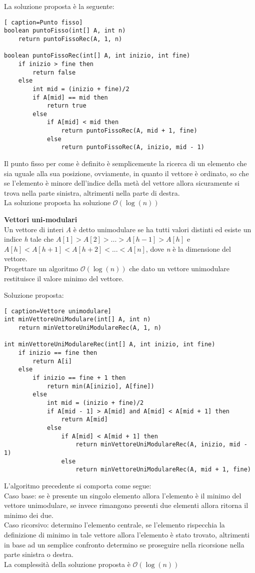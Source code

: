 \documentclass[../cheatSheetAlgoritmi.tex]{subfiles}
\begin{document}
\bigskip
La soluzione proposta è la seguente:
 

\begin{lstlisting}[ caption=Punto fisso]
boolean puntoFisso(int[] A, int n)
	return puntoFissoRec(A, 1, n)

boolean puntoFissoRec(int[] A, int inizio, int fine)
	if inizio > fine then
    	return false
  	else
    	int mid = (inizio + fine)/2
    	if A[mid] == mid then
      		return true
    	else
      		if A[mid] < mid then
        		return puntoFissoRec(A, mid + 1, fine)
      		else
        		return puntoFissoRec(A, inizio, mid - 1)
\end{lstlisting}
Il punto fisso per come è definito è semplicemente la ricerca di un elemento che sia uguale alla sua posizione, ovviamente, in quanto il vettore è ordinato, so che se l'elemento è minore dell'indice della metà del vettore allora sicuramente si trova nella parte sinistra, altrimenti nella parte di destra. \\
La soluzione proposta ha soluzione $\mathcal{O}(\log(n))$

\bigskip
\textbf{Vettori uni-modulari} \\
Un vettore di interi \textit{A} è detto unimodulare se ha tutti valori distinti ed esiste un indice \textit{h} tale che $ A[1] > A[2] > ... > A[h-1] > A[h] $ e $A[h] < A[h+1] < A[h+2] < ... < A[n]$, dove \textit{n} è la dimensione del vettore.\\ Progettare un algoritmo $\mathcal{O}(\log(n))$ che dato un vettore unimodulare restituisce il valore minimo del vettore.

\bigskip
Soluzione proposta:
\begin{lstlisting}[ caption=Vettore unimodulare]
int minVettoreUniModulare(int[] A, int n)
	return minVettoreUniModulareRec(A, 1, n)
	
int minVettoreUniModulareRec(int[] A, int inizio, int fine)
	if inizio == fine then
    	return A[i]
  	else
    	if inizio == fine + 1 then
      		return min(A[inizio], A[fine])
    	else
      		int mid = (inizio + fine)/2 
      		if A[mid - 1] > A[mid] and A[mid] < A[mid + 1] then
        		return A[mid]
      		else
        		if A[mid] < A[mid + 1] then
          			return minVettoreUniModulareRec(A, inizio, mid - 1)
        		else
          			return minVettoreUniModulareRec(A, mid + 1, fine)
\end{lstlisting}
L'algoritmo precedente si comporta come segue: \\
Caso base: 
se è presente un singolo elemento allora l'elemento è il minimo del vettore unimodulare, se invece rimangono presenti due elementi allora ritorna il minimo dei due. \\
Caso ricorsivo: determino l'elemento centrale, se l'elemento rispecchia la definizione di minimo in tale vettore allora l'elemento è stato trovato, altrimenti in base ad un semplice confronto determino se proseguire nella ricorsione nella parte sinistra o destra. \\
La complessità della soluzione proposta è $\mathcal{O}(\log(n))$
\end{document}
